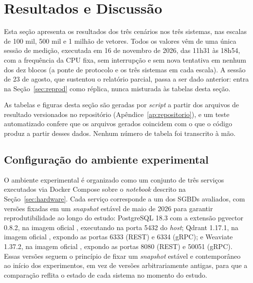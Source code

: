 
\section{Resultados e Discussão}

Esta seção apresenta os resultados dos três cenários nos três sistemas, nas escalas de 100 mil, 500 mil e 1 milhão de vetores. Todos os valores vêm de uma única sessão de medição, executada em 16 de novembro de 2026, das 11h31 às 18h54, com a frequência da CPU fixa, sem interrupção e sem nova tentativa em nenhum dos dez blocos (a ponte de protocolo e os três sistemas em cada escala). A sessão de 23 de agosto, que sustentou o relatório parcial, passa a ser dado anterior: entra na Seção~\ref{sec:reprod} como réplica, nunca misturada às tabelas desta seção.

As tabelas e figuras desta seção são geradas por \textit{script} a partir dos arquivos de resultado versionados no repositório (Apêndice~\ref{ap:repositorio}), e um teste automatizado confere que os arquivos gerados coincidem com o que o código produz a partir desses dados. Nenhum número de tabela foi transcrito à mão.

\subsection{Configuração do ambiente experimental}

O ambiente experimental é organizado como um conjunto de três serviços executados via Docker Compose sobre o \textit{notebook} descrito na Seção~\ref{sec:hardware}. Cada serviço corresponde a um dos SGBDs avaliados, com versões fixadas em um \textit{snapshot} estável de maio de 2026 para garantir reprodutibilidade ao longo do estudo: PostgreSQL 18.3 com a extensão pgvector 0.8.2, na imagem oficial , executando na porta 5432 do \textit{host}; Qdrant 1.17.1, na imagem oficial , expondo as portas 6333 (REST) e 6334 (gRPC); e Weaviate 1.37.2, na imagem oficial , expondo as portas 8080 (REST) e 50051 (gRPC). Essas versões seguem o princípio de fixar um \textit{snapshot} estável e contemporâneo ao início dos experimentos, em vez de versões arbitrariamente antigas, para que a comparação reflita o estado de cada sistema no momento do estudo.

